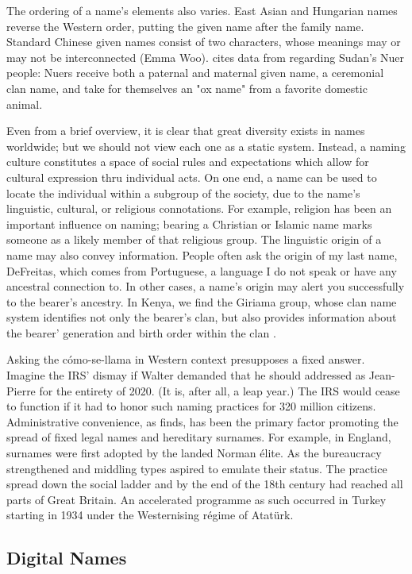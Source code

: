 The ordering of a name's elements also varies. East Asian and Hungarian names
reverse the Western order, putting the given name after the family name.
Standard Chinese given names consist of two characters, whose meanings may or
may not be interconnected (Emma Woo). \textcite{wardhaugh92} cites data from
\textcite{evans-pritchard48} regarding Sudan's Nuer people: Nuers receive both a
paternal and maternal given name, a ceremonial clan name, and take for
themselves an "ox name" from a favorite domestic animal.

Even from a brief overview, it is clear that great diversity exists in names
worldwide; but we should not view each one as a static system. Instead, a naming
culture constitutes a space of social rules and expectations which allow for
cultural expression thru individual acts. On one end, a name can be used to
locate the individual within a subgroup of the society, due to the name's
linguistic, cultural, or religious connotations. For example, religion has been
an important influence on naming; bearing a Christian or Islamic name marks
someone as a likely member of that religious group. The linguistic origin of a
name may also convey information. People often ask the origin of my last name,
DeFreitas, which comes from Portuguese, a language I do not speak or have any
ancestral connection to. In other cases, a name's origin may alert you
successfully to the bearer's ancestry. In Kenya, we find the Giriama group,
whose clan name system identifies not only the bearer's clan, but also provides
information about the bearer' generation and birth order within the clan
\textcite{parkin89}.

Asking the cómo-se-llama in Western context presupposes a fixed answer. Imagine
the IRS' dismay if Walter demanded that he should addressed as Jean-Pierre for
the entirety of 2020. (It is, after all, a leap year.) The IRS would cease to
function if it had to honor such naming practices for 320 million citizens.
Administrative convenience, as \textcite{scott02} finds, has been the primary
factor promoting the spread of fixed legal names and hereditary surnames. For
example, in England, surnames were first adopted by the landed Norman élite. As
the bureaucracy strengthened and middling types aspired to emulate their status.
The practice spread down the social ladder and by the end of the 18th century
had reached all parts of Great Britain. An accelerated programme as such
occurred in Turkey starting in 1934 under the Westernising régime of Atatürk.

\subsection{Digital Names}

